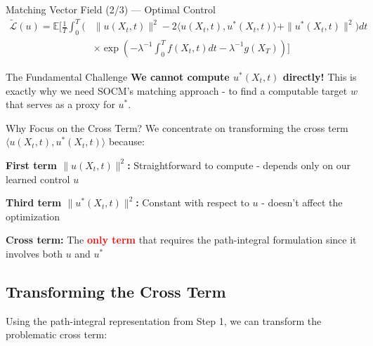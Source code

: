 \documentclass[aspectratio=169,xcolor=dvipsnames]{beamer}
\begin{document}
\begin{frame}[allowframebreaks]{Matching Vector Field (2/3) — Optimal Control}
    \begin{equation}
    \begin{aligned}
    \tilde{\mathcal{L}}(u) = \mathbb{E}\Bigg[\frac{1}{T}\int_0^T \Big(
    &\|u(X_t,t)\|^2 - 2\langle u(X_t,t), u^*(X_t,t)\rangle + \|u^*(X_t,t)\|^2\Big) dt \\[4pt]
    &\times \exp\left(-\lambda^{-1}\int_0^T f(X_t,t) dt - \lambda^{-1}g(X_T)\right)\Bigg]
    \end{aligned}
    \end{equation}
        
    \vspace{0.5cm}
    
    \begin{alertblock}{The Fundamental Challenge}
        \textbf{We cannot compute $u^*(X_t,t)$ directly!} This is exactly why we need SOCM's matching approach - to find a computable target $w$ that serves as a proxy for $u^*$.
    \end{alertblock}

        \begin{block}{Why Focus on the Cross Term?}
        We concentrate on transforming the cross term $\langle u(X_t,t), u^*(X_t,t)\rangle$ because:
        
        \vspace{0.3cm}
        
        \textbf{First term $\|u(X_t,t)\|^2$:} Straightforward to compute - depends only on our learned control $u$
        
        \vspace{0.3cm}
        
        \textbf{Third term $\|u^*(X_t,t)\|^2$:} Constant with respect to $u$ - doesn't affect the optimization
        
        \vspace{0.3cm}
        
        \textbf{Cross term:} The \textcolor{red}{\textbf{only term}} that requires the path-integral formulation since it involves both $u$ and $u^*$
    \end{block}

    \vspace{0.5cm}
    
    \subsection*{Transforming the Cross Term}
    
    Using the path-integral representation from Step 1, we can transform the problematic cross term:
    

\end{frame}
\end{document}
